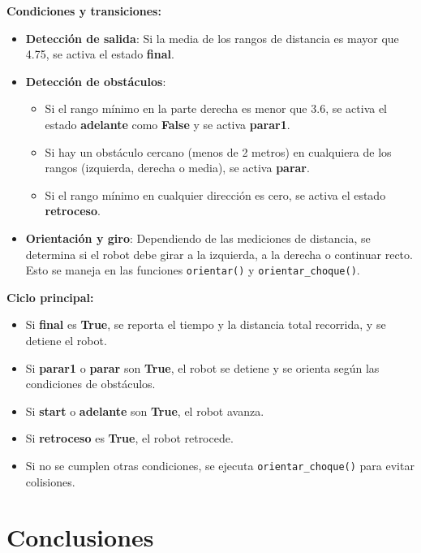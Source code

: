 \documentclass[a4paper,9pt]{article}
\begin{document}
\textbf{Condiciones y transiciones:}
\begin{itemize}
    \item \textbf{Detección de salida}: Si la media de los rangos de distancia es mayor que 4.75, se activa el estado \textbf{final}.
    \item \textbf{Detección de obstáculos}:
    \begin{itemize}
        \item Si el rango mínimo en la parte derecha es menor que 3.6, se activa el estado \textbf{adelante} como \textbf{False} y se activa \textbf{parar1}.
        \item Si hay un obstáculo cercano (menos de 2 metros) en cualquiera de los rangos (izquierda, derecha o media), se activa \textbf{parar}.
        \item Si el rango mínimo en cualquier dirección es cero, se activa el estado \textbf{retroceso}.
    \end{itemize}
    \item \textbf{Orientación y giro}: Dependiendo de las mediciones de distancia, se determina si el robot debe girar a la izquierda, a la derecha o continuar recto. Esto se maneja en las funciones \texttt{orientar()} y \texttt{orientar\_choque()}.
\end{itemize}
\textbf{Ciclo principal:}
\begin{itemize}
    \item Si \textbf{final} es \textbf{True}, se reporta el tiempo y la distancia total recorrida, y se detiene el robot.
    \item Si \textbf{parar1} o \textbf{parar} son \textbf{True}, el robot se detiene y se orienta según las condiciones de obstáculos.
    \item Si \textbf{start} o \textbf{adelante} son \textbf{True}, el robot avanza.
    \item Si \textbf{retroceso} es \textbf{True}, el robot retrocede.
    \item Si no se cumplen otras condiciones, se ejecuta \texttt{orientar\_choque()} para evitar colisiones.
\end{itemize}

\section{Conclusiones}
\end{document}
